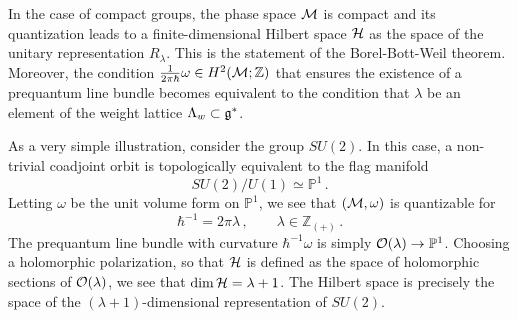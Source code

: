 \documentclass[letterpaper,12pt]{article}
\numberwithin{equation}{section}
\newcommand{\be}{\begin{equation}}
\newcommand{\ee}{\end{equation}}
\newcommand{\R}{{\mathbb{R}}}
\newcommand{\Z}{{\mathbb{Z}}}
\renewcommand{\P}{{\mathbb{P}}}
\newcommand{\fg}{{\frak{g}}}
\newcommand{\CH}{{\cal H}}
\newcommand{\CM}{{\cal M}}
\newcommand{\CO}{{\cal O}}
\renewcommand{\=}{\;=\;}
\newcommand{\p}{\partial}
\begin{document}
In the case of compact groups, the phase space $\CM$ is compact
and its quantization leads to a finite-dimensional Hilbert space $\CH$
as the space of the unitary representation $R_\lambda$.
This is the statement of the Borel-Bott-Weil theorem.
Moreover, the condition $\frac{1}{2\pi\hbar}\omega\in H^2(\CM;\Z)$ that ensures the existence of a prequantum line bundle
becomes equivalent to the condition that $\lambda$ be an element of the weight lattice $\Lambda_w\subset\fg^*$.

As a very simple illustration, consider the group $SU(2)$.
In this case, a non-trivial coadjoint orbit is topologically equivalent to the flag manifold
%
\be SU(2)/U(1) \simeq \P^1 \,. \ee
%
Letting $\omega$ be the unit volume form on $\P^1$, we see that $(\CM,\omega)$ is quantizable for
%
\be \hbar^{-1} = 2\pi\lambda\,, \qquad \lambda\in\Z_{(+)}\,. \ee
%
The prequantum line bundle with curvature $\hbar^{-1}\omega$ is simply $\CO(\lambda)\to \P^1$.
Choosing a holomorphic polarization, so that $\CH$ is defined as the space of holomorphic sections
of $\CO(\lambda)$, we see that $\dim\CH = \lambda+1$.
The Hilbert space is precisely the space of the $(\lambda+1)$-dimensional representation of $SU(2)$.
\end{document}
